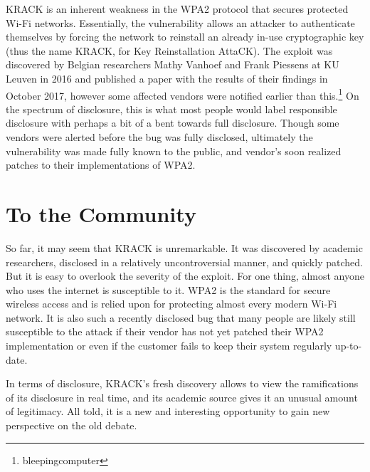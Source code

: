 \documentclass[12pt]{article}
\begin{document}
\begin{doublespace}
KRACK is an inherent weakness in the WPA2 protocol that
secures protected Wi-Fi networks. Essentially, the vulnerability allows an
attacker to authenticate themselves by forcing the network to reinstall an
already in-use cryptographic key (thus the name KRACK, for Key Reinstallation
AttaCK). The exploit was discovered by Belgian researchers Mathy Vanhoef and
Frank Piessens at KU Leuven in 2016 and published a paper with the results
of their findings in October 2017, however some affected vendors were notified
earlier than this.\footnote{bleepingcomputer} On the spectrum of disclosure,
this is what most people would label responsible disclosure with perhaps a bit
of a bent towards full disclosure. Though some vendors were alerted before the
bug was fully disclosed, ultimately the vulnerability was made fully
known to the public, and vendor's soon realized patches to their
implementations of WPA2.

\section*{To the Community}
So far, it may seem that KRACK is unremarkable. It was discovered by academic
researchers, disclosed in a relatively uncontroversial manner, and quickly
patched. But it is easy to overlook the severity of the exploit. For one thing,
almost anyone who uses the internet is susceptible to it. WPA2 is the standard
for secure wireless access and is relied upon for protecting almost every
modern Wi-Fi network. It is also such a recently disclosed bug that many people
are likely still susceptible to the attack if their vendor has not yet patched
their WPA2 implementation or even if the customer fails to keep their system
regularly up-to-date.

In terms of disclosure, KRACK's fresh discovery allows to view the
ramifications of its disclosure in real time, and its academic source gives it
an unusual amount of legitimacy. All told, it is a new and interesting
opportunity to gain new perspective on the old debate.

%
%

\end{doublespace}
\end{document}

